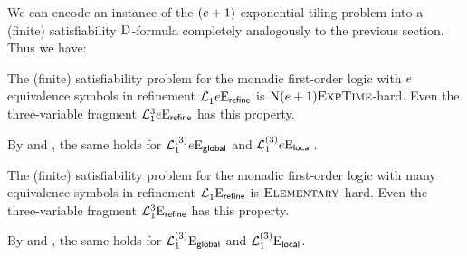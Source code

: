 We can encode an instance of the $(e+1)$-exponential tiling problem into a
(finite) satisfiability ${\mathrm{D}}$-formula completely analogously to the previous
section. Thus we have:
\begin{proposition}\label{prop:mon-hard}
The (finite) satisfiability problem for the monadic first-order logic with
$e$ equivalence symbols in refinement $\mathcal{L}^{{}}_{1}{e}\mathrm{E}_{\mathsf{refine}}$ is
$\text{\normalfont{\scshape N}}(e+1)\text{\normalfont{\scshape ExpTime}}$-hard. Even the three-variable fragment
$\mathcal{L}^{3}_{1}{e}\mathrm{E}_{\mathsf{refine}}$ has this property.

By  and , the same
holds for $\mathcal{L}^{(3)}_{1}{e}\mathrm{E}_{\mathsf{global}}$ and
$\mathcal{L}^{(3)}_{1}{e}\mathrm{E}_{\mathsf{local}}$.
\end{proposition}
\begin{proposition}
The (finite) satisfiability problem for the monadic first-order logic with many
equivalence symbols in refinement $\mathcal{L}^{{}}_{1}{{}}\mathrm{E}_{\mathsf{refine}}$ is
$\text{\normalfont{\scshape Elementary}}$-hard. Even the three-variable fragment
$\mathcal{L}^{3}_{1}{{}}\mathrm{E}_{\mathsf{refine}}$ has this property.

By  and , the same 
holds for $\mathcal{L}^{(3)}_{1}{{}}\mathrm{E}_{\mathsf{global}}$ and
$\mathcal{L}^{(3)}_{1}{{}}\mathrm{E}_{\mathsf{local}}$.
\end{proposition}